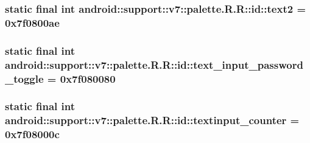 \hypertarget{classandroid_1_1support_1_1v7_1_1palette_1_1_r_1_1id_2d98fcd92a649848343e99d55cac64a4}{
\subsubsection[{text2}]{\setlength{\rightskip}{0pt plus 5cm}static final int android::support::v7::palette.R.R::id::text2 = 0x7f0800ae}}
\label{classandroid_1_1support_1_1v7_1_1palette_1_1_r_1_1id_2d98fcd92a649848343e99d55cac64a4}


\hypertarget{classandroid_1_1support_1_1v7_1_1palette_1_1_r_1_1id_30b4434078f0808197c53cadd1f8ed8a}{
\subsubsection[{text\_\-input\_\-password\_\-toggle}]{\setlength{\rightskip}{0pt plus 5cm}static final int android::support::v7::palette.R.R::id::text\_\-input\_\-password\_\-toggle = 0x7f080080}}
\label{classandroid_1_1support_1_1v7_1_1palette_1_1_r_1_1id_30b4434078f0808197c53cadd1f8ed8a}


\hypertarget{classandroid_1_1support_1_1v7_1_1palette_1_1_r_1_1id_903418e94498a49c86871ac70194d868}{
\subsubsection[{textinput\_\-counter}]{\setlength{\rightskip}{0pt plus 5cm}static final int android::support::v7::palette.R.R::id::textinput\_\-counter = 0x7f08000c}}
\label{classandroid_1_1support_1_1v7_1_1palette_1_1_r_1_1id_903418e94498a49c86871ac70194d868}



